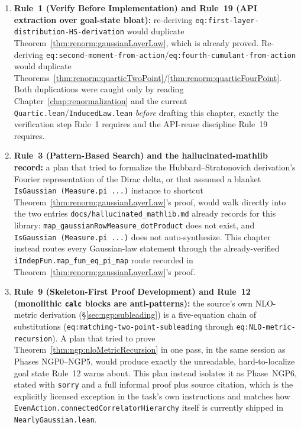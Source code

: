 \begin{enumerate}
  \item \textbf{Rule~1 (Verify Before Implementation) and Rule~19 (API extraction over goal-state
    bloat):} re-deriving \texttt{eq:first-layer-distribution-HS-derivation} would duplicate
    Theorem~\ref{thm:renorm:gaussianLayerLaw}, which is already proved. Re-deriving
    \texttt{eq:second-moment-from-action}/\texttt{eq:fourth-cumulant-from-action} would duplicate
    Theorems~\ref{thm:renorm:quarticTwoPoint}/\ref{thm:renorm:quarticFourPoint}. Both duplications
    were caught only by reading Chapter~\ref{chap:renormalization} and the current
    \texttt{Quartic.lean}/\texttt{InducedLaw.lean} \emph{before} drafting this chapter, exactly the
    verification step Rule~1 requires and the API-reuse discipline Rule~19 requires.
  \item \textbf{Rule~3 (Pattern-Based Search) and the hallucinated-mathlib record:} a plan that
    tried to formalize the Hubbard--Stratonovich derivation's Fourier representation of the Dirac
    delta, or that assumed a blanket \texttt{IsGaussian (Measure.pi ...)} instance to shortcut
    Theorem~\ref{thm:renorm:gaussianLayerLaw}'s proof, would walk directly into the two entries
    \texttt{docs/hallucinated\_mathlib.md} already records for this library:
    \texttt{map\_gaussianRowMeasure\_dotProduct} does not exist, and
    \texttt{IsGaussian (Measure.pi ...)} does not auto-synthesize. This chapter instead routes
    every Gaussian-law statement through the already-verified
    \texttt{iIndepFun.map\_fun\_eq\_pi\_map} route recorded in
    Theorem~\ref{thm:renorm:gaussianLayerLaw}'s proof.
  \item \textbf{Rule~9 (Skeleton-First Proof Development) and Rule~12 (monolithic \texttt{calc}
    blocks are anti-patterns):} the source's own NLO-metric derivation
    (\S\ref{sec:ngp:subleading}) is a five-equation chain of substitutions
    (\texttt{eq:matching-two-point-subleading} through \texttt{eq:NLO-metric-recursion}). A plan
    that tried to prove Theorem~\ref{thm:ngp:nloMetricRecursion} in one pass, in the same session as
    Phases NGP0--NGP5, would produce exactly the unreadable, hard-to-localize goal state Rule~12
    warns about. This plan instead isolates it as Phase~NGP6, stated with \texttt{sorry} and a full
    informal proof plus source citation, which is the explicitly licensed exception in the task's
    own instructions and matches how \texttt{EvenAction.connectedCorrelatorHierarchy} itself is
    currently shipped in \texttt{NearlyGaussian.lean}.

\end{enumerate}
